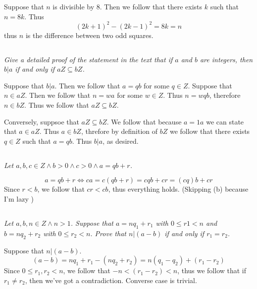 \documentclass[11pt,oneside,titlepage]{book}
\DeclareMathOperator \lra {\Leftrightarrow}
\begin{document}
Suppose that $n$ is divisible by 8. Then we follow that there exists $k$ such that
$n = 8k$. Thus
$$(2k + 1)^2 - (2 k - 1)^2 = 8k = n$$
thus $n$ is the difference between two odd squares.

\subsection{}

\textit{Give a detailed proof of the statement in the text that if $a$ and $b$ are integers,
  then $b|a$ if and only if $aZ \subseteq bZ$.}

Suppose that $b|a$. Then we follow that $a = qb$ for some $q \in Z$.
Suppose that $n \in aZ$. Then we follow that $n = wa$ for some $w \in Z$. Thus
$n = wqb$, therefore $n \in bZ$. Thus we follow that $aZ \subseteq bZ$.

Conversely, suppsoe that $aZ \subseteq bZ$. We follow that because $a = 1a$ we can state that
$a \in aZ$. Thus $a \in bZ$, threfore by definition of $bZ$ we follow that there exists
$q \in Z$ such that $a = qb$. Thus $b | a$, as desired.

\subsection{}

\textit{Let $a, b, c \in Z \land b > 0 \land c > 0 \land a = qb + r$.}

$$a = qb + r \lra ca = c(qb + r) = cqb + cr = (cq)b + cr$$
Since $r < b$, we follow that $cr < cb$, thus everything holds.
(Skipping (b) because I'm lazy )


\subsection{}

\textit{Let $a, b, n \in Z \land n > 1$. Suppose that $a = nq_1 + r_1$ with $0 \leq r1 < n$
  and $b = nq_2 + r_2$ with $0 \leq r_2 < n$. Prove that $n | (a - b)$ if and only if $r_1 = r_2$.
}

Suppose that $n | (a - b)$.
$$(a - b) = n q_1 + r_1 - (nq_2 + r_2) = n(q_1 - q_2) + (r_1 - r_2)$$
Since $0 \leq r_1, r_2 < n$, we follow that $-n < (r_1 - r_2) < n$, thus we follow that
if $r_1 \neq r_2$, then we've got a contradiction. Converse case is trivial.

\subsection{}
\end{document}
